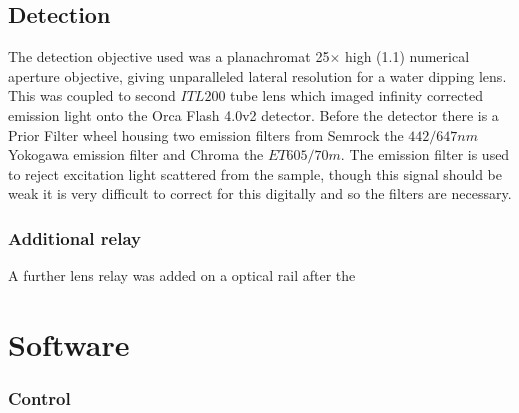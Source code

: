 
\subsection{Detection}

The detection objective used was a planachromat \SI{25}{}$\times$ high (\SI{1.1}{}) numerical aperture objective, giving unparalleled lateral resolution for a water dipping lens.
This was coupled to second $ITL200$ tube lens which imaged infinity corrected emission light onto the Orca Flash 4.0v2 detector.
Before the detector there is a Prior Filter wheel housing two emission filters from Semrock the $442/647 nm$ Yokogawa emission filter and Chroma the $ET605/70m$.
The emission filter is used to reject excitation light scattered from the sample, though this signal should be weak it is very difficult to correct for this digitally and so the filters are necessary.

\subsubsection{Additional relay}

A further lens relay was added on a optical rail after the


\section{Software}

\subsubsection{Control}


